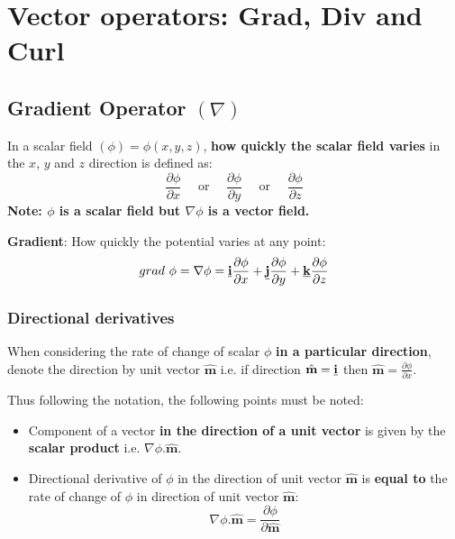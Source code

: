 \documentclass[10pt,a4paper]{article}
\begin{document}
\section{Vector operators: Grad, Div and Curl}
\subsection{Gradient Operator $(\nabla)$}

In a scalar field $(\phi)=\phi(x,y,z)$, \textbf{how quickly the scalar field varies} in the $x$, $y$ and $z$
direction is defined as:
$$
    \frac{\partial \phi}{\partial x} \quad \text{ or } \quad \frac{\partial \phi}{\partial y} \quad \text{ or } \quad \frac{\partial \phi}{\partial z}
$$
\textbf{Note: $\phi$ is a scalar field but $\nabla\phi$ is a vector field.}
\begin{tcolorbox}[breakable,colback=white]
    \textbf{Gradient}: How quickly the potential varies at any point:
    $$
        grad\text{ }\phi=\nabla\phi=\textbf{\underline{i}}\frac{\partial \phi}{\partial x} + \textbf{\underline{j}}\frac{\partial \phi}{\partial y} + \textbf{\underline{k}}\frac{\partial \phi}{\partial z}
    $$
\end{tcolorbox}

\subsubsection{Directional derivatives}

When considering the rate of change of scalar $\phi$ \textbf{in a particular direction}, denote the
direction by unit vector $\hat{\textbf{m}}$ i.e. if direction
$\hat{\textbf{m}}=\textbf{\underline{i}}$ then $\hat{\textbf{m}}=\frac{\partial \phi}{\partial x}$.

Thus following the notation, the following points must be noted:
\begin{itemize}
    \item Component of a vector \textbf{in the direction of a unit vector} is given by the
    \textbf{scalar product} i.e. $\nabla \phi . \hat{\textbf{m}}$.
    \item Directional derivative of $\phi$ in the direction of unit vector $\hat{\textbf{m}}$ is
    \textbf{equal to} the rate of change of $\phi$ in direction of unit vector $\hat{\textbf{m}}$:
    $$
    \nabla\phi.\hat{\textbf{m}} = \frac{\partial \phi}{\partial \hat{\textbf{m}}} 
    $$
\end{itemize}
\end{document}
